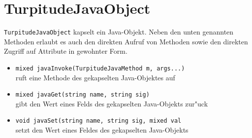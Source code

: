 
\section{TurpitudeJavaObject}

\texttt{TurpitudeJavaObject} kapselt ein Java-Objekt. Neben den unten
genannten Methoden erlaubt es auch den direkten Aufruf von Methoden sowie
den direkten Zugriff auf Attribute in gewohnter Form.

\begin{itemize}
\item
\texttt{mixed javaInvoke(TurpitudeJavaMethod m, args...)}\\
ruft eine Methode des gekapselten Java-Objektes auf
\item
\texttt{mixed javaGet(string name, string sig)}\\
gibt den Wert eines Felds des gekapselten Java-Objekts zur"uck
\item
\texttt{void javaSet(string name, string sig, mixed val}\\
setzt den Wert eines Feldes des gekapselten Java-Objekts
\end{itemize}
